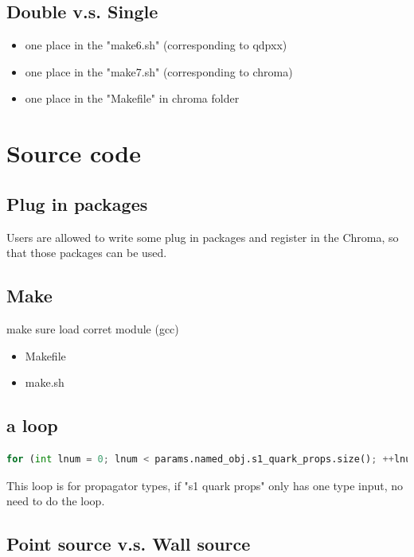 \documentclass{article}
\begin{document}
\subsection{Double v.s. Single}

\begin{itemize}
  \item one place in the "make6.sh" (corresponding to qdpxx)
  \item one place in the "make7.sh" (corresponding to chroma)
  \item one place in the "Makefile" in chroma folder
\end{itemize}

\section{Source code}

\subsection{Plug in packages}

Users are allowed to write some plug in packages and register in the Chroma, so that those packages can be used.

\subsection{Make}

make sure load corret module (gcc)

\begin{itemize}
    \item Makefile
    \item make.sh 
\end{itemize}


\subsection{a loop}

\begin{lstlisting}[language=Python]
for (int lnum = 0; lnum < params.named_obj.s1_quark_props.size(); ++lnum)
\end{lstlisting}

This loop is for propagator types, if "s1 quark props" only has one type input, no need to do the loop.

\subsection{Point source v.s. Wall source}
\end{document}
